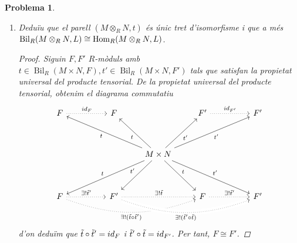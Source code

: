 \documentclass[compress]{article}
\newtheorem{problema}{Problema}
\theoremstyle{definition}
\DeclareMathOperator{\Hom}{Hom}
\DeclareMathOperator{\Bil}{Bil}
\begin{document}
\begin{problema}
\begin{enumerate}
\begin{proof}
            \begin{align*}
                \Tilde{f}(t(m,n))
                &=\Tilde{f}((m,n)+E)
                &\quad&\textrm{(Per definició de $t:=\pi\circ\iota$)}\\
                &=f(m,n)
                &\quad&\textrm{(Per definició de $\Tilde{f}$)}
            \end{align*}
            Doncs, existeix un $R$-mòdul $F_{R}(M\times N)/E$ amb una aplicació bilineal $t\in\Bil_{R}(M\times N,F_{R}(M\times N)/E)$ que compleix la propietat universal del producte tensorial.
        \end{proof}
        \item Deduïu que el parell $(M\otimes_{R}N,t)$ és únic tret d'isomorfisme i que a més $\Bil_{R}(M\otimes_{R} N,L)\cong\Hom_{R}(M\newline\otimes_{R}N,L)$.
        \begin{proof}
            Siguin $F,F'$ $R$-mòduls amb $t\in\Bil_{R}(M\times N,F),t'\in\Bil_{R}(M\times N,F')$ tals que satisfan la propietat universal del producte tensorial. De la propietat universal del producte tensorial, obtenim el diagrama commutatiu
            \begin{equation*}
            \begin{tikzcd}
                F
                \arrow[dotted]{rr}{id_{F}}
                &&F
                &&F'
                \arrow[dotted]{rr}{id_{F'}}
                &&F'\\\\
                &&&M\times N
                \arrow[swap]{ddlll}{t}
                \arrow[swap]{ddl}{t'}
                \arrow{ddr}{t}
                \arrow{ddrrr}{t'}
                \arrow{uulll}{t}
                \arrow{uul}{t}
                \arrow[swap]{uur}{t'}
                \arrow[swap]{uurrr}{t'}&&&\\
                \\
                F
                \arrow[dotted]{rr}{\exists!\Tilde{t}'}
                \arrow[dotted, bend right=20, swap]{rrrr}{\exists!(\Tilde{t}\circ\Tilde{t}')}
                &&F'
                \arrow[dotted]{rr}{\exists!\Tilde{t}}
                \arrow[dotted, bend right=20, crossing over, swap]{rrrr}{\exists!(\Tilde{t}'\circ\Tilde{t})}
                &&F
                \arrow[dotted]{rr}{\exists!\Tilde{t}'}&&F'
            \end{tikzcd}
            \end{equation*}
            d'on deduïm que $\Tilde{t}\circ\Tilde{t}'=id_{F}$ i $\Tilde{t}'\circ\Tilde{t}=id_{F'}$. Per tant, $F\cong F'$.
        \end{proof}
     \end{enumerate}
\end{problema}
\end{document}
